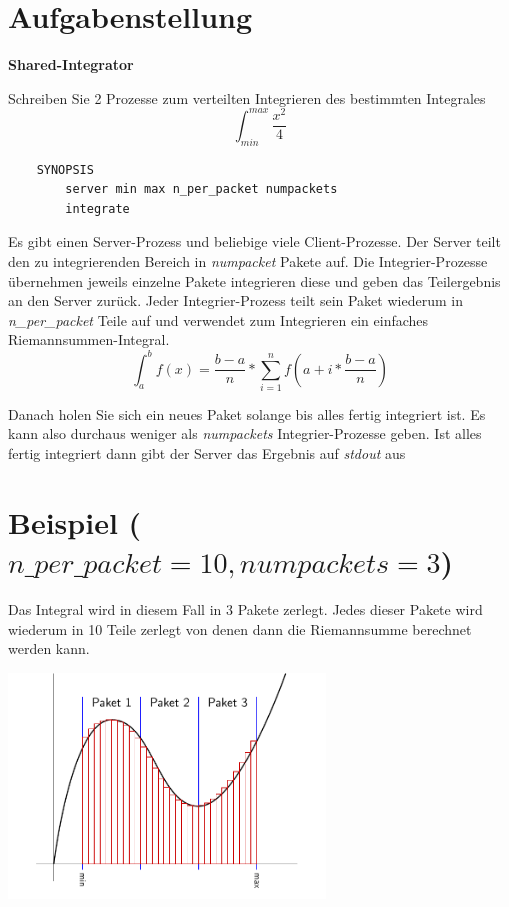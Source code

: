 

\usepackage{graphicx}




\section*{Aufgabenstellung}

\textbf{Shared-Integrator}

Schreiben Sie 2 Prozesse zum verteilten Integrieren des bestimmten Integrales 
$$\int^{max}_{min} \frac{x^2}{4}$$

\begin{verbatim}
    SYNOPSIS
        server min max n_per_packet numpackets
        integrate 
\end{verbatim}

Es gibt einen Server-Prozess und beliebige viele Client-Prozesse. 
Der Server teilt den zu integrierenden Bereich in \emph{numpacket} Pakete auf. 
Die Integrier-Prozesse übernehmen jeweils einzelne Pakete integrieren diese und geben das Teilergebnis an den Server zurück. 
Jeder Integrier-Prozess teilt sein Paket wiederum in \emph{n\_per\_packet} Teile auf und verwendet zum Integrieren ein einfaches Riemannsummen-Integral.
$$\int^b_a f(x) = \frac{b-a}n * \sum_{i=1}^{n} f(a+i*\frac{b-a}{n})$$

Danach holen Sie sich ein neues Paket solange bis alles fertig integriert ist. Es kann also durchaus weniger als \emph{numpackets} Integrier-Prozesse geben. Ist alles fertig integriert dann gibt der Server das Ergebnis auf \emph{stdout} aus

\section*{Beispiel {\small($n\_per\_packet=10, numpackets=3$)}}
Das Integral wird in diesem Fall in 3 Pakete zerlegt.
Jedes dieser Pakete wird wiederum in 10 Teile zerlegt von denen dann die Riemannsumme berechnet werden kann.

\begin{center}
\includegraphics[height=6cm]{integfigure.pdf}
\end{center}

